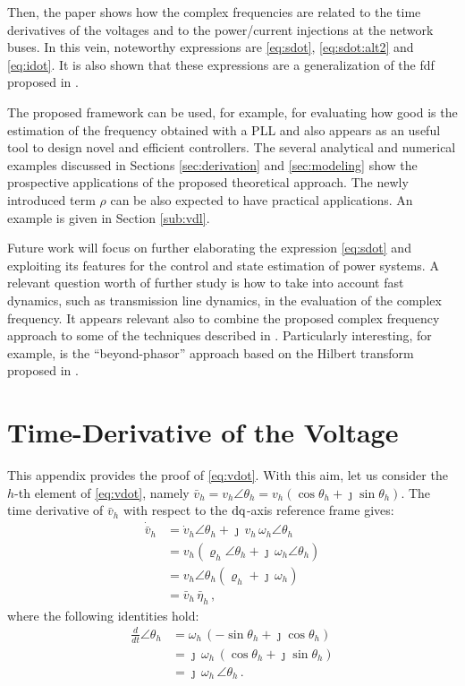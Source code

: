 \documentclass[journal, twocolumn, letter]{IEEEtran}
\newcommand{\vh}{v_h}
\newcommand{\vhbar}{\bar{v}_h}
\newcommand{\vhdot}{\dot{v}_h}
\newcommand{\vhbardot}{\dot{\bar{v}}_h}
\newcommand{\etah}{\bar{\eta}_h}
\newcommand{\rhoh}{\varrho_h}
\renewcommand{\th}{\theta_h}
\newcommand{\wh}{\omega_h}
\newcommand{\jj}{\jmath}
\begin{document}
Then, the paper shows how the complex frequencies are related to the
time derivatives of the voltages and to the power/current injections
at the network buses.  In this vein, noteworthy expressions are
\eqref{eq:sdot}, \eqref{eq:sdot:alt2} and \eqref{eq:idot}.  It is also
shown that these expressions are a generalization of the \ac{fdf}
proposed in \cite{Divider}.


The proposed framework can be used, for example, for evaluating how
good is the estimation of the frequency obtained with a PLL and also
appears as an useful tool to design novel and efficient controllers.
The several analytical and numerical examples discussed in Sections
\ref{sec:derivation} and \ref{sec:modeling} show the prospective
applications of the proposed theoretical approach.  The newly
introduced term $\rho$ can be also expected to have practical
applications.  An example is given in Section \ref{sub:vdl}.

Future work will focus on further elaborating the expression
\eqref{eq:sdot} and exploiting its features for the control and state
estimation of power systems.  A relevant question worth of further
study is how to take into account fast dynamics, such as transmission
line dynamics, in the evaluation of the complex frequency.  It appears
relevant also to combine the proposed complex frequency approach to
some of the techniques described in \cite{Paolone:2020}.  Particularly
interesting, for example, is the ``beyond-phasor'' approach based on
the Hilbert transform proposed in \cite{8928939}.

\appendices

\section{Time-Derivative of the Voltage}
\label{app:vdot}

This appendix provides the proof of \eqref{eq:vdot}.  With this aim,
let us consider the $h$-th element of \eqref{eq:vdot}, namely
$\vhbar = \vh \angle \th = \vh (\cos \th + \jj \sin \th)$.  The time
derivative of $\vhbar$ with respect to the $\rm dq$-axis reference
frame gives:
\begin{align*}
  \vhbardot &= \vhdot \angle \th + \jj \, \vh \, \wh \angle \th \\
            &= \vh \left ( \rhoh \angle \th + \jj \, \wh \angle \th \right ) \\
            &= \vh \angle \th \left ( \rhoh + \jj \, \wh \right ) \\
            &= \vhbar \, \etah \, ,
\end{align*}
where the following identities hold:
\begin{align*}
  \frac{d}{dt} \angle \th &= \wh \, (- \sin \th + \jj \cos \th) \\
  &= \jj \, \wh \, (\cos \th + \jj \sin \th) \\
  &= \jj \, \wh \, \angle \th \, .
\end{align*}
\end{document}
